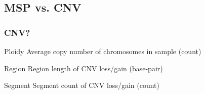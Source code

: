 \documentclass{beamer}
\begin{document}
    \subsection{MSP vs. CNV}
    \begin{frame}
        \frametitle{CNV?}

        \begin{block}{Ploidy}
            Average copy number of chromosomes in sample (count)
        \end{block}

        \begin{block}{Region}
            Region length of CNV loss/gain (base-pair)
        \end{block}

        \begin{block}{Segment}
            Segment count of CNV loss/gain (count)
        \end{block}
    \end{frame}
\end{document}
